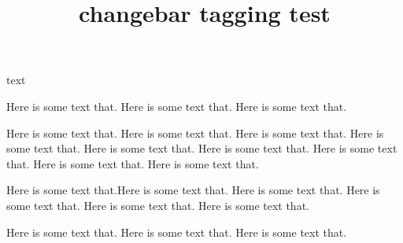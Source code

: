 \documentclass{article}
\title{changebar tagging test}
\begin{document}
\cbstart
text
\cbend

\cbdelete
Here is some text that. Here is some text that. Here is some text that.

\begin{changebar}[5pt]
Here is some text that. Here is some text that. Here is some text that.
Here is some text that. Here is some text that. Here is some text that.
Here is some text that. Here is some text that. Here is some text that.

Here is some text that.\cbdelete[10pt] Here is some text that. Here is some text that.
Here is some text that. Here is some text that. Here is some text that.
\end{changebar}

Here is some text that. Here is some text that. Here is some text that.
\end{document}
